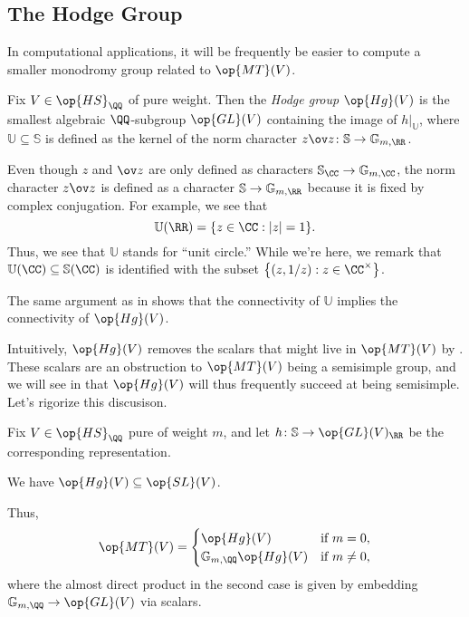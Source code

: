 \documentclass[../thesis.tex]{subfiles}
\begin{document}
\subsection{The Hodge Group}
In computational applications, it will be frequently be easier to compute a smaller monodromy group related to $\op{MT}(V)$.
\begin{definition}
	Fix $V\in\op{HS}_\QQ$ of pure weight. Then the \textit{Hodge group} $\op{Hg}(V)$ is the smallest algebraic $\QQ$-subgroup $\op{GL}(V)$ containing the image of $h|_{\mathbb U}$, where $\mathbb U\subseteq\mathbb S$ is defined as the kernel of the norm character $z\ov z\colon\mathbb S\to\mathbb G_{m,\RR}$.
\end{definition}
\begin{remark}
	Even though $z$ and $\ov z$ are only defined as characters $\mathbb S_\CC\to\mathbb G_{m,\CC}$, the norm character $z\ov z$ is defined as a character $\mathbb S\to\mathbb G_{m,\RR}$ because it is fixed by complex conjugation. For example, we see that
	\[\mathbb U(\RR)=\{z\in\CC:\left|z\right|=1\}.\]
	Thus, we see that $\mathbb U$ stands for ``unit circle.'' While we're here, we remark that $\mathbb U(\CC)\subseteq\mathbb S(\CC)$ is identified with the subset $\left\{(z,1/z):z\in\CC^\times\right\}$.
\end{remark}
\begin{remark} \label{rem:hg-connected}
	The same argument as in  shows that the connectivity of $\mathbb U$ implies the connectivity of $\op{Hg}(V)$.
\end{remark}
Intuitively, $\op{Hg}(V)$ removes the scalars that might live in $\op{MT}(V)$ by . These scalars are an obstruction to $\op{MT}(V)$ being a semisimple group, and we will see in  that $\op{Hg}(V)$ will thus frequently succeed at being semisimple. Let's rigorize this discusison.
\begin{lemma} \label{lem:mt-by-hg}
	Fix $V\in\op{HS}_\QQ$ pure of weight $m$, and let $h\colon\mathbb S\to\op{GL}(V)_\RR$ be the corresponding representation.
	\begin{listalph}
		\item We have $\op{Hg}(V)\subseteq\op{SL}(V)$.
		\item Thus,
		\[\op{MT}(V)=\begin{cases}
			\op{Hg}(V) & \text{if }m=0, \\
			\mathbb G_{m,\QQ}\op{Hg}(V) & \text{if }m\ne0,
		\end{cases}\]
		where the almost direct product in the second case is given by embedding $\mathbb G_{m,\QQ}\to\op{GL}(V)$ via scalars.
	\end{listalph}
\end{lemma}
\end{document}
